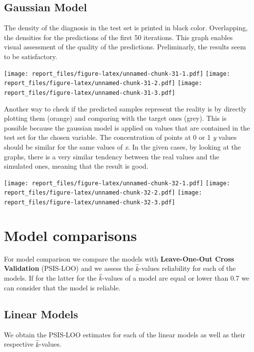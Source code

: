 \documentclass[
]{article}
\begin{document}
\hypertarget{gaussian-model-2}{%
\subsection{Gaussian Model}\label{gaussian-model-2}}

The density of the diagnosis in the test set is printed in black color.
Overlapping, the densities for the predictions of the first 50
iterations. This graph enables visual assessment of the quality of the
predictions. Preliminarly, the results seem to be satisfactory.

\texttt{[image: report\_files/figure-latex/unnamed-chunk-31-1.pdf]}
\texttt{[image: report\_files/figure-latex/unnamed-chunk-31-2.pdf]}
\texttt{[image: report\_files/figure-latex/unnamed-chunk-31-3.pdf]}

Another way to check if the predicted samples represent the reality is
by directly plotting them (orange) and comparing with the target ones
(grey). This is possible because the gaussian model is applied on values
that are contained in the test set for the chosen variable. The
concentration of points at 0 or 1 \emph{y} values should be similar for
the same values of \emph{x}. In the given cases, by looking at the
graphs, there is a very similar tendency between the real values and the
simulated ones, meaning that the result is good.

\texttt{[image: report\_files/figure-latex/unnamed-chunk-32-1.pdf]}
\texttt{[image: report\_files/figure-latex/unnamed-chunk-32-2.pdf]}
\texttt{[image: report\_files/figure-latex/unnamed-chunk-32-3.pdf]}

\hypertarget{model-comparisons}{%
\section{Model comparisons}\label{model-comparisons}}

For model comparison we compare the models with \textbf{Leave-One-Out
Cross Validation} (PSIS-LOO) and we assess the \(\hat{k}\)-values
reliability for each of the models. If for the latter for the
\(\hat{k}\)-values of a model are equal or lower than 0.7 we can
consider that the model is reliable.

\hypertarget{linear-models-2}{%
\subsection{Linear Models}\label{linear-models-2}}

We obtain the PSIS-LOO estimates for each of the linear models as well
as their respective \(\hat{k}\)-values.
\end{document}
